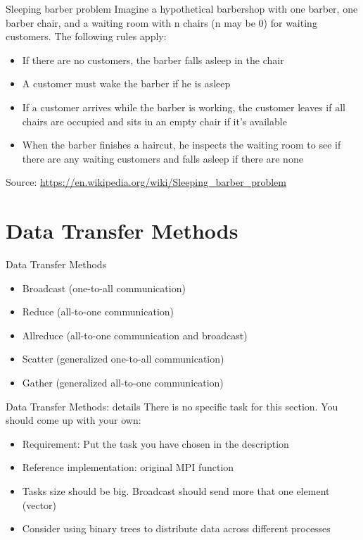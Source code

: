 \documentclass{beamer}
\begin{document}
\begin{frame}{Sleeping barber problem}
  Imagine a hypothetical barbershop with one barber, one barber chair, and a waiting room with n chairs (n may be 0) for waiting customers. The following rules apply:
  \begin{itemize}
    \item If there are no customers, the barber falls asleep in the chair
    \item A customer must wake the barber if he is asleep
    \item If a customer arrives while the barber is working, the customer leaves if all chairs are occupied and sits in an empty chair if it's available
    \item When the barber finishes a haircut, he inspects the waiting room to see if there are any waiting customers and falls asleep if there are none
  \end{itemize}

  Source: \href{https://en.wikipedia.org/wiki/Sleeping_barber_problem}{https://en.wikipedia.org/wiki/Sleeping\_barber\_problem}
\end{frame}

\section{Data Transfer Methods}

\begin{frame}{Data Transfer Methods}
  \begin{itemize}
    \item Broadcast (one-to-all communication)
    \item Reduce (all-to-one communication)
    \item Allreduce (all-to-one communication and broadcast)
    \item Scatter (generalized one-to-all communication)
    \item Gather (generalized all-to-one communication)
  \end{itemize}
\end{frame}

\begin{frame}{Data Transfer Methods: details}
  There is no specific task for this section. You should come up with your own:
  \begin{itemize}
    \item Requirement: Put the task you have chosen in the description
    \item Reference implementation: original MPI function
    \item Tasks size should be big. Broadcast should send more that one element (vector)
    \item Consider using binary trees to distribute data across different processes
  \end{itemize}
\end{frame}
\end{document}

